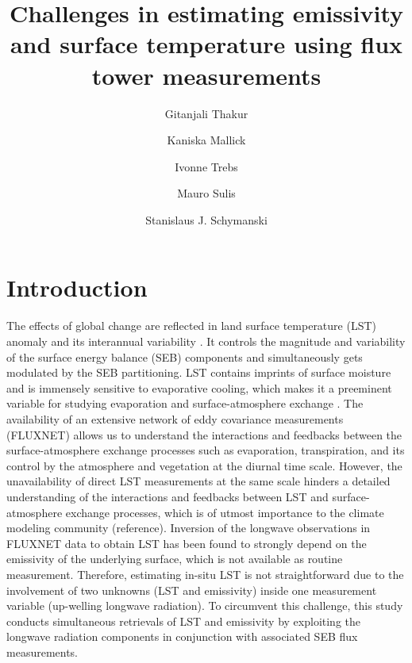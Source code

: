 \documentclass[fleqn,10pt]{wlscirep}
\title{ Challenges in estimating emissivity and surface temperature using flux tower measurements}
\author[1,*]{Gitanjali Thakur}
\author[1]{Kaniska Mallick }
\author[1]{Ivonne Trebs}
\author[1]{Mauro Sulis}
\author[1,*]{ Stanislaus J. Schymanski}
\affil[1]{Luxembourg Institute of Science and Technology, ERIN, Belvaux, L-4422, Luxembourg}
\affil[*]{gitanjali.thakur@list.lu}
\affil[*]{stanislaus.schymanski@list.lu}
\begin{document}
\flushbottom
\maketitle
%
%
\thispagestyle{empty}


\section*{Introduction}

The effects of global change are reflected in land surface temperature (LST) anomaly and its interannual variability \cite{rowell2005scenario}. It controls the magnitude and variability of the surface energy balance (SEB) components and simultaneously gets modulated by the SEB partitioning\cite{mallick2015reintroducing,timmermans2007intercomparison}. LST contains imprints of surface moisture and is immensely sensitive to evaporative cooling, which makes it a preeminent variable for studying evaporation and surface-atmosphere exchange \cite{mallick2018critical,trebs2021role,kustas2009advances}. The availability of an extensive network of eddy covariance measurements (FLUXNET) allows us to understand the interactions and feedbacks between the surface-atmosphere exchange processes such as evaporation, transpiration, and its control by the atmosphere and vegetation at the diurnal time scale. However, the unavailability of direct LST measurements at the same scale hinders a detailed understanding of the interactions and feedbacks between LST and surface-atmosphere exchange processes, which is of utmost importance to the climate modeling community (reference). Inversion of the longwave observations in FLUXNET data to obtain LST has been found to strongly depend on the emissivity of the underlying surface\cite{mallick2018bridging}, which is not available as routine measurement. Therefore, estimating in-situ LST is not straightforward due to the involvement of two unknowns (LST and emissivity) inside one measurement variable (up-welling longwave radiation). To circumvent this challenge, this study conducts simultaneous retrievals of LST and emissivity by exploiting the longwave radiation components in conjunction with associated SEB flux measurements.
\end{document}

